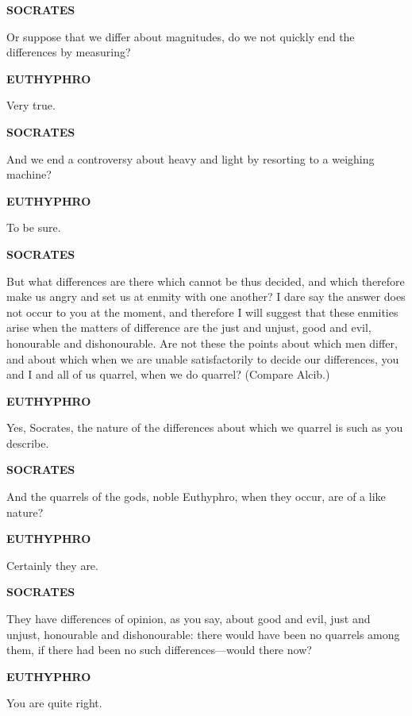 \documentclass[11pt,letter]{article}
\begin{document}
\par \textbf{SOCRATES}
\par   Or suppose that we differ about magnitudes, do we not quickly end the differences by measuring?

\par \textbf{EUTHYPHRO}
\par   Very true.

\par \textbf{SOCRATES}
\par   And we end a controversy about heavy and light by resorting to a weighing machine?

\par \textbf{EUTHYPHRO}
\par   To be sure.

\par \textbf{SOCRATES}
\par   But what differences are there which cannot be thus decided, and which therefore make us angry and set us at enmity with one another? I dare say the answer does not occur to you at the moment, and therefore I will suggest that these enmities arise when the matters of difference are the just and unjust, good and evil, honourable and dishonourable. Are not these the points about which men differ, and about which when we are unable satisfactorily to decide our differences, you and I and all of us quarrel, when we do quarrel? (Compare Alcib.)

\par \textbf{EUTHYPHRO}
\par   Yes, Socrates, the nature of the differences about which we quarrel is such as you describe.

\par \textbf{SOCRATES}
\par   And the quarrels of the gods, noble Euthyphro, when they occur, are of a like nature?

\par \textbf{EUTHYPHRO}
\par   Certainly they are.

\par \textbf{SOCRATES}
\par   They have differences of opinion, as you say, about good and evil, just and unjust, honourable and dishonourable:  there would have been no quarrels among them, if there had been no such differences—would there now?

\par \textbf{EUTHYPHRO}
\par   You are quite right.
\end{document}
